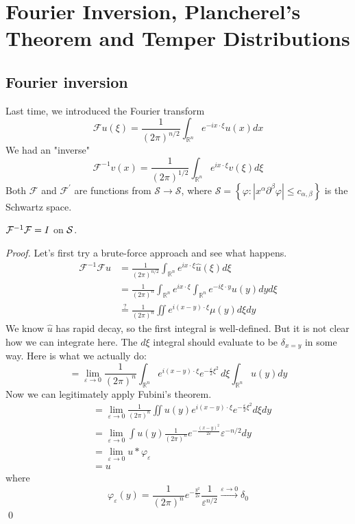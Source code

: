 \newpage 
\section{Fourier Inversion, Plancherel's Theorem and Temper Distributions}

\subsection{Fourier inversion}
Last time, we introduced the Fourier transform 
$$
\mathcal{F} u(\xi)=\frac{1}{(2 \pi)^{n / 2}} \int_{\mathbb{R}^{n}} e^{-i x \cdot \xi} u(x) d x
$$
We had an "inverse"
$$
\mathcal{F}^{-1} v(x)=\frac{1}{(2 \pi)^{1 / 2}} \int_{\mathbb{R}^{n}} e^{i x \cdot \xi} v(\xi) d \xi
$$
Both $\mathcal{F}$ and $\mathcal{F}^{\prime}$ are functions from $\mathcal{S} \rightarrow \mathcal{S}$, where $\mathcal{S}=\left\{\varphi:\left|x^{\alpha} \partial^{\beta} \varphi\right| \leq c_{\alpha, \beta}\right\}$ is the Schwartz space.

\begin{theorem}
$\mathcal{F}^{-1}\mathcal{F} = I$ on $\mathcal{S}$.
\end{theorem}
\begin{proof}
    Let's first try a brute-force approach and see what happens.
    $$
    \begin{aligned}
    \mathcal{F}^{-1} \mathcal{F} u &=\frac{1}{(2 \pi)^{n / 2}} \int_{\mathbb{R}^{n}} e^{i x \cdot \xi} \widehat{u}(\xi) d \xi \\
    &=\frac{1}{(2 \pi)^{n}} \int_{\mathbb{R}^{n}} e^{i x \cdot \xi} \int_{\mathbb{R}^{n}} e^{-i \xi \cdot y} u(y) d y d \xi \\
    & \stackrel{?}{=} \frac{1}{(2 \pi)^{n}} \iint e^{i(x-y) \cdot \xi} \mu(y) d \xi d y
    \end{aligned}
    $$
    We know $\widehat{u}$ has rapid decay, so the first integral is well-defined. But it is not clear how we can integrate here. The $d \xi$ integral should evaluate to be $\delta_{x=y}$ in some way. Here is what we actually do:
$$
=\lim _{\varepsilon \rightarrow 0} \frac{1}{(2 \pi)^{n}} \int_{\mathbb{R}^{n}} e^{i (x-y) \cdot \xi} e^{-\frac{\varepsilon}{2} \xi^{2}}\, d\xi \int_{\mathbb{R}^{n}} u(y) d y
$$
Now we can legitimately apply Fubini's theorem.
$$
\begin{aligned}
&=\lim _{\varepsilon \rightarrow 0} \frac{1}{(2 \pi)^{n}} \iint u(y) e^{i(x-y) \cdot \xi} e^{-\frac{\varepsilon}{2} \xi^{2}} d \xi d y \\
&=\lim _{\varepsilon \rightarrow 0} \int u(y) \frac{1}{(2\pi)^n} e^{-\frac{(x-y)^{2}}{2 \varepsilon}} \varepsilon^{-n / 2} d y \\
&=\lim _{\varepsilon \rightarrow 0}  u * \varphi_{\varepsilon} \\
&=u
\end{aligned}
$$
where
$$
\varphi_{\varepsilon}(y)=\frac{1}{(2 \pi)^{n}} e^{-\frac{y^{2}}{2 \varepsilon}} \frac{1}{\varepsilon^{n / 2}} \stackrel{\varepsilon \rightarrow 0}{\longrightarrow} \delta_{0}
$$
\qed 
\end{proof}

